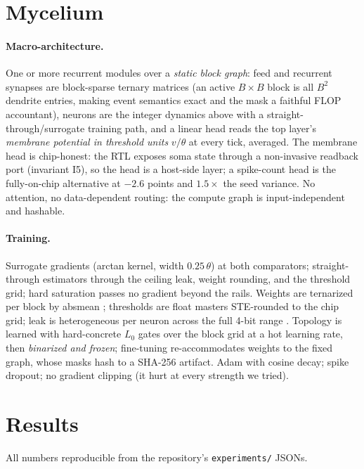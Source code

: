 \documentclass[11pt]{article}
\begin{document}
\section{Mycelium}

\paragraph{Macro-architecture.} One or more recurrent modules over a
\emph{static block graph}: feed and recurrent synapses are block-sparse
ternary matrices (an active $B{\times}B$ block is all $B^2$ dendrite entries,
making event semantics exact and the mask a faithful FLOP accountant),
neurons are the integer dynamics above with a straight-through/surrogate
training path, and a linear head reads the top layer's \emph{membrane
potential in threshold units} $v/\theta$ at every tick, averaged. The
membrane head is chip-honest: the RTL exposes soma state through a
non-invasive readback port (invariant I5), so the head is a host-side layer;
a spike-count head is the fully-on-chip alternative at $-2.6$ points and
$1.5\times$ the seed variance. No attention, no data-dependent routing: the
compute graph is input-independent and hashable.

\paragraph{Training.} Surrogate gradients (arctan kernel, width
$0.25\,\theta$) at both comparators; straight-through estimators through the
ceiling leak, weight round\-ing, and the threshold grid; hard saturation
passes no gradient beyond the rails. Weights are ternarized per block by
absmean \cite{ma2024bitnet}; thresholds are float masters STE-rounded to the
chip grid; leak is heterogeneous per neuron across the full 4-bit range
\cite{perez2021neural}. Topology is learned with hard-concrete $L_0$ gates
\cite{louizos2018learning} over the block grid at a hot learning rate, then
\emph{binarized and frozen}; fine-tuning re-accommodates weights to the fixed
graph, whose masks hash to a SHA-256 artifact. Adam with cosine decay; spike
dropout; no gradient clipping (it hurt at every strength we tried).

\section{Results}

All numbers reproducible from the repository's \texttt{experiments/} JSONs.
\end{document}

